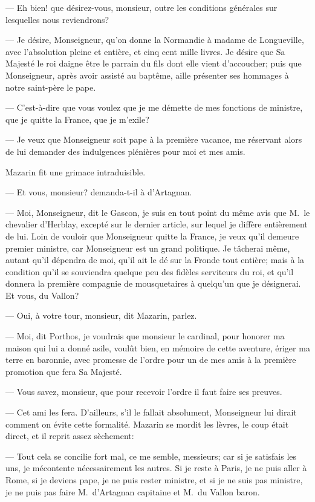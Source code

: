 — Eh bien! que désirez-vous, monsieur, outre les conditions générales sur lesquelles nous reviendrons?

— Je désire, Monseigneur, qu'on donne la Normandie à madame de Longueville, avec l'absolution pleine et entière, et cinq cent mille livres. Je désire que Sa Majesté le roi daigne être le parrain du fils dont elle vient d'accoucher; puis que Monseigneur, après avoir assisté au baptême, aille présenter ses hommages à notre saint-père le pape.

— C'est-à-dire que vous voulez que je me démette de mes fonctions de ministre, que je quitte la France, que je m'exile?

— Je veux que Monseigneur soit pape à la première vacance, me réservant alors de lui demander des indulgences plénières pour moi et mes amis.

Mazarin fit une grimace intraduisible.

— Et vous, monsieur? demanda-t-il à d'Artagnan.

— Moi, Monseigneur, dit le Gascon, je suis en tout point du même avis que M.~le chevalier d'Herblay, excepté sur le dernier article, sur lequel je diffère entièrement de lui. Loin de vouloir que Monseigneur quitte la France, je veux qu'il demeure premier ministre, car Monseigneur est un grand politique. Je tâcherai même, autant qu'il dépendra de moi, qu'il ait le dé sur la Fronde tout entière; mais à la condition qu'il se souviendra quelque peu des fidèles serviteurs du roi, et qu'il donnera la première compagnie de mousquetaires à quelqu'un que je désignerai. Et vous, du Vallon?

— Oui, à votre tour, monsieur, dit Mazarin, parlez.

— Moi, dit Porthos, je voudrais que monsieur le cardinal, pour honorer ma maison qui lui a donné asile, voulût bien, en mémoire de cette aventure, ériger ma terre en baronnie, avec promesse de l'ordre pour un de mes amis à la première promotion que fera Sa Majesté.

— Vous savez, monsieur, que pour recevoir l'ordre il faut faire ses preuves.

— Cet ami les fera. D'ailleurs, s'il le fallait absolument, Monseigneur lui dirait comment on évite cette formalité.
Mazarin se mordit les lèvres, le coup était direct, et il reprit assez sèchement:

— Tout cela se concilie fort mal, ce me semble, messieurs; car si je satisfais les uns, je mécontente nécessairement les autres. Si je reste à Paris, je ne puis aller à Rome, si je deviens pape, je ne puis rester ministre, et si je ne suis pas ministre, je ne puis pas faire M.~d'Artagnan capitaine et M.~du Vallon baron.

